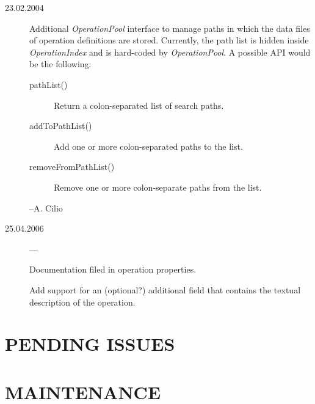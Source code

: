 \documentclass[a4paper,twoside]{tce}
\begin{document}
\begin{description}
\item[23.02.2004]%
  Additional \emph{OperationPool} interface to manage paths in which the
  data files of operation definitions are stored.  Currently, the path list
  is hidden inside \emph{OperationIndex} and is hard-coded by
  \emph{OperationPool}.  A possible API would be the following:
  \begin{description}
  \item[pathList()]%
    Return a colon-separated list of search paths.
  \item[addToPathList()]%
    Add one or more colon-separated paths to the list.
  \item[removeFromPathList()]%
    Remove one or more colon-separate paths from the list.
  \end{description}
  --A. Cilio
\item[25.04.2006] ---

  Documentation filed in operation properties.

  Add support for an (optional?) additional field that contains the textual
  description of the operation.
\end{description}


\chapter{PENDING ISSUES}


\chapter{MAINTENANCE}








\cleardoublepage

\end{document}
